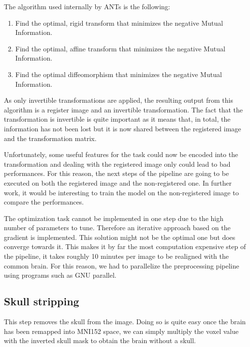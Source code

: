 The algorithm used internally by ANTs\footnotemark{} is the following:
\begin{enumerate}
\item Find the optimal, rigid transform that minimizes the negative Mutual Information.
\item Find the optimal, affine transform that minimizes the negative Mutual Information.
\item Find the optimal diffeomorphism that minimizes the negative Mutual Information.
\end{enumerate}
As only invertible transformations are applied, the resulting output from this algorithm is a register image and an invertible transformation. The fact that the transformation is invertible is quite important as it means that, in total, the information has not been lost but it is now shared between the registered image and the transformation matrix.

Unfortunately, some useful features for the task could now be encoded into the transformation and dealing with the registered image only could lead to bad performances. For this reason, the next steps of the pipeline are going to be executed on both the registered image and the non-registered one. In further work, it would be interesting to train the model on the non-registered image to compare the performances.
 
The optimization task cannot be implemented in one step due to the high number of parameters to tune. Therefore an iterative approach based on the gradient is implemented. This solution might not be the optimal one but does converge towards it. This makes it by far the most computation expensive step of the pipeline, it takes roughly 10 minutes per image to be realigned with the common brain. For this reason, we had to parallelize the preprocessing pipeline using programs such as GNU parallel\footnotemark{}.

\subsection{Skull stripping}
This step removes the skull from the image. Doing so is quite easy once the brain has been remapped into MNI152 space, we can simply multiply the voxel value with the inverted skull mask to obtain the brain without a skull. 

